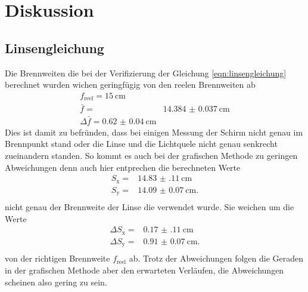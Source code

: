 \section{Diskussion}
\label{sec:Diskussion}
\subsection{Linsengleichung}
Die Brennweiten die bei der Verifizierung der Gleichung \eqref{eqn:linsengleichung} berechnet wurden wichen geringfügig von den reelen Brennweiten ab
\begin{align*}
 f_\text{reel} = \SI{15}{\centi\meter} \\
 \bar{f} = & \SI{14.384(37)}{\centi\meter}\\
 \Delta \bar{f} = \SI{0.62(4)}{\centi\meter}
\end{align*}
Dies ist damit zu befründen, dass bei einigen Messung der Schirm nicht genau im Brennpunkt stand oder die Linse und die Lichtquele nicht genau senkrecht zueinandern standen.
So kommt es auch bei der grafischen Methode zu geringen Abweichungen denn auch hier entprechen die berechneten Werte
\begin{align*}
    S_\text{x} = & \SI{14.83(11)}{\centi\meter}\\
    S_\text{y} = & \SI{14.09(7)}{\centi\meter}. \\
\end{align*}
nicht genau der Brennweite der Linse die verwendet wurde.
Sie weichen um die Werte 
\begin{align*}
   \Delta S_\text{x} = & \SI{0.17(11)}{\centi\meter} \\
    \Delta S_\text{y} = & \SI{0.91(7)}{\centi\meter}. \\
\end{align*}
von der richtigen Brennweite $f_\text{reel}$ ab.
Trotz der Abweichungen folgen die Geraden in der grafischen Methode aber den erwarteten Verläufen, die Abweichungen scheinen also gering zu sein.


